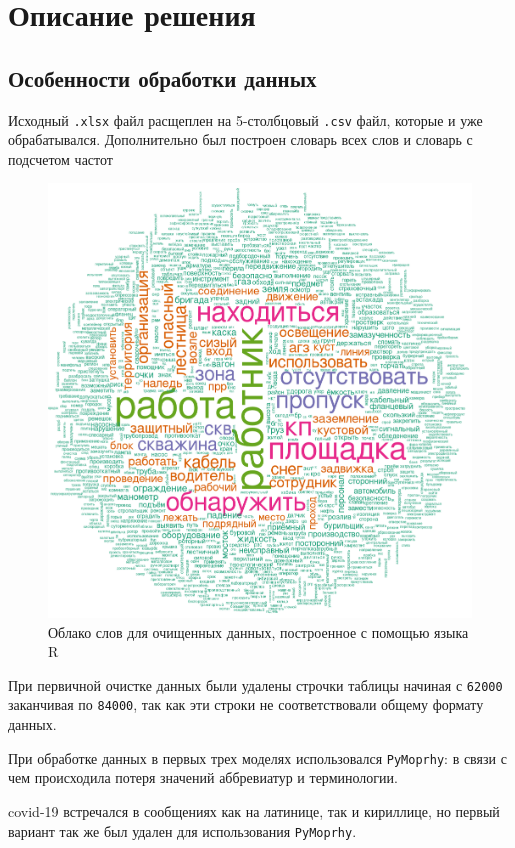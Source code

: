 \documentclass{article}
\begin{document}
\section{Описание решения}
\subsection{Особенности обработки данных}
Исходный \texttt{.xlsx} файл расщеплен на 5-столбцовый \texttt{.csv} файл, которые и уже обрабатывался. Дополнительно был построен словарь всех слов и словарь с подсчетом частот

\begin{figure}[h!]
    \centering
    \includegraphics[scale=0.2]{image.png}
    \caption{Облако слов для очищенных данных, построенное с помощью языка R}
\end{figure}


При первичной очистке данных были удалены строчки таблицы начиная с \texttt{62000} заканчивая по \texttt{84000}, так как эти строки не соответствовали общему формату данных.

При обработке данных в первых трех моделях использовался \texttt{PyMoprhy}: в связи с чем происходила потеря значений аббревиатур и терминологии.

covid-19 встречался в сообщениях как на латинице, так и кириллице, но первый вариант так же был удален для использования \texttt{PyMoprhy}.
\end{document}
